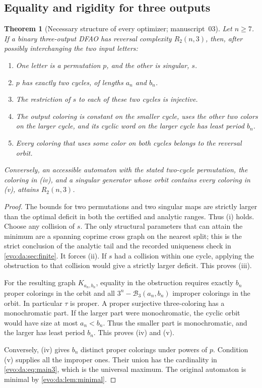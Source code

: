 \documentclass[11pt,a4paper]{article}
\numberwithin{equation}{section}
\newtheorem{theorem}{Theorem}[section]
\theoremstyle{definition}
\theoremstyle{remark}
\newcommand{\Bip}{\mathcal B}
\begin{document}
\subsection{Equality and rigidity for three outputs}

\begin{theorem}[Necessary structure of every optimizer; manuscript~03]\label{evo:da:thm:rigid3}
Let $n\ge7$. If a binary three-output DFAO has reversal complexity
$R_2(n,3)$, then, after possibly interchanging the two input letters:
\begin{enumerate}[label=(\roman*)]
\item One letter is a permutation $p$, and the other is singular, $s$.
\item $p$ has exactly two cycles, of lengths $a_n$ and $b_n$.
\item The restriction of $s$ to each of these two cycles is injective.
\item The output coloring is constant on the smaller cycle, uses the other two
colors on the larger cycle, and its cyclic word on the larger cycle has least
period $b_n$.
\item Every coloring that uses some color on both cycles belongs to the
reversal orbit.
\end{enumerate}
Conversely, an accessible automaton with the stated two-cycle permutation,
the coloring in (iv), and a singular generator whose orbit contains every
coloring in (v), attains $R_2(n,3)$.
\end{theorem}
\begin{proof}
The bounds for two permutations and two singular maps are strictly larger
than the optimal deficit in both the certified and analytic ranges. Thus (i)
holds. Choose any collision of $s$. The only structural parameters that can
attain the minimum are a spanning coprime cross graph on the nearest split;
this is the strict conclusion of the analytic tail and the recorded
uniqueness check in \cref{evo:da:sec:finite}. It forces (ii). If $s$ had a
collision within one cycle, applying the obstruction to that collision would
give a strictly larger deficit. This proves (iii).

For the resulting graph $K_{a_n,b_n}$, equality in the obstruction requires
exactly $b_n$ proper colorings in the orbit and all $3^n-\Bip_3(a_n,b_n)$
improper colorings in the orbit. In particular $\tau$ is proper. A proper
surjective three-coloring has a monochromatic part. If the larger part were
monochromatic, the cyclic orbit would have size at most $a_n<b_n$. Thus the
smaller part is monochromatic, and the larger has least period $b_n$. This
proves (iv) and (v).

Conversely, (iv) gives $b_n$ distinct proper colorings under powers of $p$.
Condition (v) supplies all the improper ones. Their union has the cardinality
in \eqref{evo:da:eq:main3}, which is the universal maximum. The original
automaton is minimal by \cref{evo:da:lem:minimal}.
\end{proof}
\end{document}
